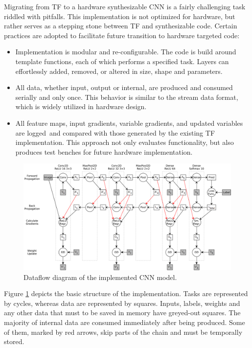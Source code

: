Migrating from TF to a hardware synthesizable CNN is a fairly challenging task riddled with pitfalls. This implementation is not optimized for hardware, but rather serves as a stepping stone between TF and synthesizable code. Certain practices are adopted to facilitate future transition to hardware targeted code:

\begin{itemize}[leftmargin=*]
    \item Implementation is modular and re-configurable. The code is build around template functions, each of which performs a specified task. Layers can effortlessly added, removed, or altered in size, shape and parameters.
    \item All data, whether input, output or internal, are produced and consumed serially and only once. This behavior is similar to the stream data format, which is widely utilized in hardware design.
    \item All feature maps, input gradients, variable gradients, and updated variables are logged and compared with those generated by the existing TF implementation. This approach not only evaluates functionality, but also produces test benches for future hardware implementation.
\end{itemize}

\begin{figure}[H]
    \centering
        \includegraphics[width=1\textwidth]{Images/block_diagrams/dataflow_cnn_model.png}
        \decoRule
        \caption[CNN dataflow]{Dataflow diagram of the implemented CNN model.}
        \label{fig: CNN dataflow}
\end{figure}

Figure \ref{fig: CNN dataflow} depicts the basic structure of the implementation. Tasks are represented by cycles, whereas data are represented by squares. Inputs, labels, weights and any other data that must to be saved in memory have greyed-out squares. The majority of internal data are consumed immediately after being produced. Some of them, marked by red arrows, skip parts of the chain and must be temporally stored.

